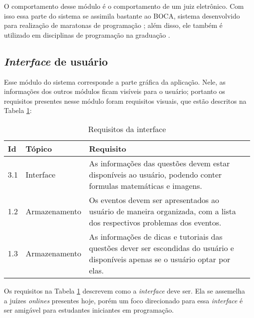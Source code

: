 O comportamento desse módulo é o comportamento de um juiz eletrônico. Com isso essa parte do sistema se assimila bastante ao BOCA, sistema desenvolvido para realização de maratonas de programação \cite{de2004boca}; além disso, ele também é utilizado em disciplinas de programação na graduação \cite{francisco2016juiz}.



\subsection{\textit{Interface} de usuário}
\label{subsec:ui}

Esse módulo do sistema corresponde a parte gráfica da aplicação. Nele, as informações dos outros módulos ficam visíveis para o usuário; portanto os requisitos presentes nesse módulo foram requisitos visuais, que estão descritos na Tabela \ref{table:reqInterface}:

\begin{table}[ht]
    \caption{Requisitos da interface}
    \centering
    \label{table:reqInterface}
    \begin{tabular}{ |p{0.6cm}|p{3cm}|p{10cm}|  }
        \hline
        
        \textbf{Id} & 
        \textbf{Tópico} & 
        \textbf{Requisito} \\
        \hline
        
        3.1 & 
        Interface   & 
        As informações das questões devem estar disponíveis ao usuário, podendo conter formulas matemáticas e imagens. \\
        \hline
        
        1.2 & 
        Armazenamento & 
        Os eventos devem ser apresentados ao usuário de maneira organizada, com a lista dos respectivos problemas dos eventos.  \\ 
        \hline
        
        1.3 & 
        Armazenamento & 
        As informações de dicas e tutoriais das questões dever ser escondidas do usuário e disponíveis apenas se o usuário optar por elas.  \\
        \hline
    \end{tabular}

\end{table}

Os requisitos na Tabela \ref{table:reqInterface} descrevem como a \textit{interface} deve ser. Ela se assemelha a juízes \textit{onlines} presentes hoje, porém um foco direcionado para essa \textit{interface} é ser amigável para estudantes iniciantes em programação.

